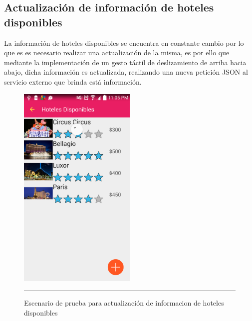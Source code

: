 \subsection{Actualización de información de hoteles disponibles}
La información de hoteles disponibles se encuentra en constante cambio por lo que es es necesario realizar una actualización de la misma, 
es por ello que mediante la implementación de un gesto táctil de deslizamiento de arriba hacia abajo, dicha información es actualizada, 
realizando una nueva petición JSON al servicio externo que brinda está información.
\begin{figure}[h]
	\centering
		\includegraphics[width=0.5\textwidth]{Figuras/actualizaHoteles.png}
		\rule{30em}{0.5pt}
	\caption[Escenario de prueba para actualización de información de hoteles disponibles]{Escenario de prueba para actualización de informacion de hoteles disponibles}
	\label{fig:vistaPruebaActh}
\end{figure}
\clearpage

